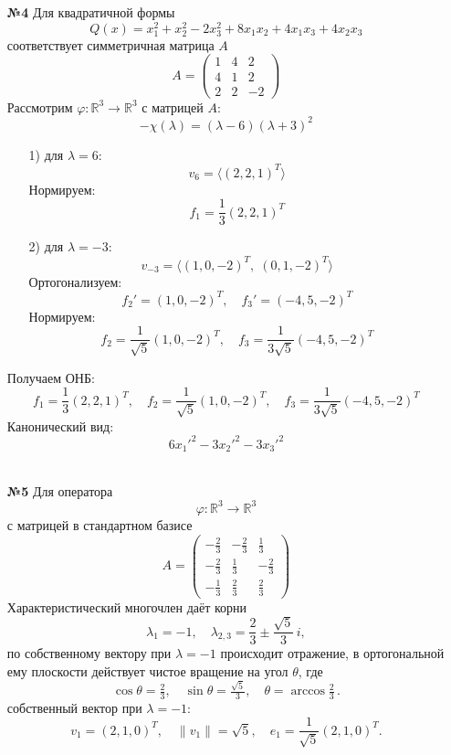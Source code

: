 \documentclass[a4paper]{article}
\renewcommand{\f}[2]{\frac{#1}{#2}}
\renewcommand{\phi}{\varphi}
\newcommand{\RR}{\mathbb{R}}
\begin{document}
\begin{enumerate}
  \item[\textbf{№4}]Для квадратичной формы
  $$
  Q(x)=x_1^2+x_2^2-2x_3^2+8x_1x_2+4x_1x_3+4x_2x_3
  $$
  соответствует симметричная матрица $A$
  $$
  A=\begin{pmatrix}
  1 & 4 & 2\\
  4 & 1 & 2\\
  2 & 2 & -2
  \end{pmatrix}
  $$
  Рассмотрим $\phi: \RR^3 \to \RR^3$ с матрицей $A$:
  $$-\chi(\lambda) = (\lambda-6)(\lambda+3)^2$$
  \begin{enumerate}
    \item[1)] для $\lambda = 6$:
    $$v_6 = \langle (2,2,1)^T \rangle$$
    Нормируем:
    $$f_1 = \f{1}{3}(2,2,1)^T$$
    \item[2)] для $\lambda = -3$:
    $$v_{-3} = \langle (1,0,-2)^T,\;(0,1,-2)^T\rangle$$
    Ортогонализуем:
    $$f_2' = (1,0,-2)^T, \quad f_3' = (-4,5,-2)^T$$
    Нормируем:
    $$f_2 = \f{1}{\sqrt{5}}(1,0,-2)^T, \quad f_3 = \f{1}{3\sqrt{5}}(-4,5,-2)^T$$
  \end{enumerate}
  Получаем ОНБ:
  $$f_1 = \f{1}{3}(2,2,1)^T, \quad f_2 = \f{1}{\sqrt{5}}(1,0,-2)^T, \quad f_3 = \f{1}{3\sqrt{5}}(-4,5,-2)^T$$
  Канонический вид:
  $$6x_1'^2 -3x_2'^2 - 3x_3'^2$$\\

  \item[\textbf{№5}]Для оператора
  $$
  \phi: \RR^3 \to \RR^3
  $$
  с матрицей в стандартном базисе
  $$
  A=\begin{pmatrix}
  -\tfrac23 & -\tfrac23 & \tfrac13\\[3pt]
  -\tfrac23 & \tfrac13 & -\tfrac23\\[3pt]
  -\tfrac13 & \tfrac23 & \tfrac23
  \end{pmatrix}
  $$
  Характеристический многочлен даёт корни
  $$
  \lambda_1=-1,\quad 
  \lambda_{2,3}=\frac23\pm\frac{\sqrt5}{3}\,i,
  $$
  по собственному вектору при $\lambda=-1$ происходит отражение, в ортогональной ему плоскости действует чистое вращение на угол $\theta$, где
  $$
    \cos\theta=\tfrac23,\quad \sin\theta=\tfrac{\sqrt5}{3}, 
    \quad\theta=\arccos\tfrac23\,.
  $$
  собственный вектор при $\lambda=-1$:
  $$
     v_1=(2,1,0)^T,\quad \|v_1\|=\sqrt{5},  
     \quad e_1=\frac1{\sqrt5}(2,1,0)^T.
   $$
\end{enumerate}
\end{document}
